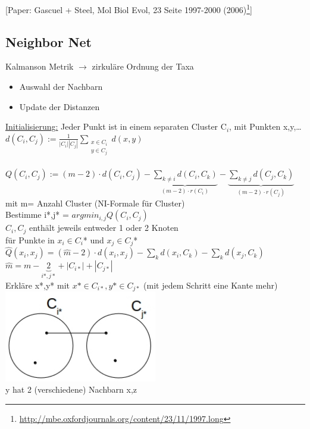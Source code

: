 [Paper: Gascuel + Steel, Mol Biol Evol, 23 Seite 1997-2000 (2006)\footnote{\url{http://mbe.oxfordjournals.org/content/23/11/1997.long}}]

\newpage

\subsection{Neighbor Net}
Kalmanson Metrik $\rightarrow$ zirkuläre Ordnung der Taxa
\begin{itemize}
	\item Auswahl der Nachbarn
	\item Update der Distanzen
\end{itemize}

\underline{Initialisierung:} Jeder Punkt ist in einem separaten Cluster C$_i$, mit Punkten x,y,…\\
$d(C_i,C_j):=\frac{1}{|C_i||C_j|} \displaystyle \sum_{\substack{x \in C_i \\ y \in C_j}}d(x,y)$\\
\\
$Q(C_i,C_j):=(m-2) \cdot d(C_i,C_j) - \displaystyle \underbrace{\sum_{k \neq i} d(C_i,C_k)}_{(m-2) \cdot r(C_i)} - \displaystyle \underbrace{\sum_{k \neq j} d(C_j,C_k)}_{(m-2) \cdot r(C_j)}$\\
mit m= Anzahl Cluster (NI-Formale für Cluster)\\
Bestimme i*,j* = $argmin_{i,j} Q(C_i,C_j)$\\
$C_i,C_j$ enthält jeweils entweder 1 oder 2 Knoten\\
für Punkte in $x_i \in C_i$* und $x_j \in C_j$*\\
$\hat Q(x_i,x_j)=(\hat m -2) \cdot d(x_i,x_j) - \displaystyle \sum_{k} d(x_i,C_k) - \displaystyle \sum_{k} d(x_j,C_k)$\\
$\hat m = m - \underbrace{2}_{i*,j*} + |C_{i*}| + |C_{j*}|$\\
Erkläre x*,y* mit $x* \in C_{i*}, y* \in C_{j*}$ (mit jedem Schritt eine Kante mehr)
\includegraphics[width=0.5\textwidth]{lectures/161221/pix/4.jpg}\\
y hat 2 (verschiedene) Nachbarn x,z\\
